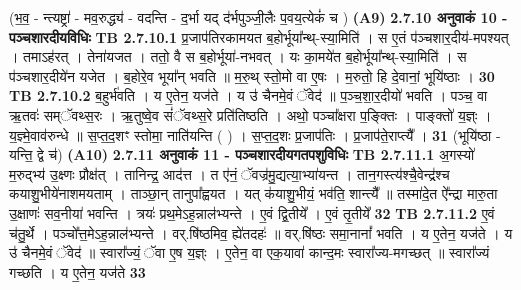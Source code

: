 \documentclass[17pt]{extarticle}
\begin{document}
{                  \newline
                                    (भ॒व॒ - न्त्यष्ट्रा॑ - मव॒रुद्ध्य॑ - वदन्ति - द॒र्भा यद् द॑र्भपुञ्जी॒लैः प॒वय॒त्येकं॑ च ) \textbf{(A9)} \newline \newline
                \textbf{ 2.7.10     अनुवाकं   10 - पञ्चशारदीयविधिः} \newline
                                \textbf{ TB 2.7.10.1} \newline
                  प्र॒जाप॑तिरकामयत ब॒होर्भूया᳚न्थ्-स्या॒मिति॑ । स ए॒तं प॑ञ्चशार॒दीय॑-मपश्यत् । तमाऽह॑रत् । तेना॑यजत । ततो॒ वै स ब॒होर्भूया॑-नभवत् । यः का॒मये॑त ब॒होर्भूया᳚न्थ्-स्या॒मिति॑ । स प॑ञ्चशार॒दीये॑न यजेत । ब॒होरे॒व भूया᳚न् भवति ॥ म॒रु॒थ् स्तो॒मो वा ए॒षः । म॒रुतो॒ हि दे॒वानां॒ भूयि॑ष्ठाः । \textbf{ 30} \newline
                  \newline
                                \textbf{ TB 2.7.10.2} \newline
                  ब॒हुर्भ॑वति । य ए॒तेन॒ यज॑ते । य उ॑ चैनमे॒वं ॅवेद॑ ॥ प॒ञ्च॒शा॒र॒दीयो॑ भवति । पञ्च॒ वा ऋ॒तवः॑ सम्ॅवथ्स॒रः । ऋ॒तुष्वे॒व सं॑ॅवथ्स॒रे प्रति॑तिष्ठति । अथो॒ पञ्चा᳚क्षरा प॒ङ्क्तिः । पाङ्क्तो॑ य॒ज्ञ्ः । य॒ज्ञ्मे॒वाव॑रुन्धे ॥ स॒प्त॒द॒शꣳ स्तोमा॒ नाति॑यन्ति ( ) । स॒प्त॒द॒शः प्र॒जाप॑तिः । प्र॒जाप॑ते॒राप्त्यै᳚ । \textbf{ 31} \newline
                  \newline
                                    (भूयि॑ष्ठा - यन्ति॒ द्वे च॑) \textbf{(A10)} \newline \newline
                \textbf{ 2.7.11     अनुवाकं   11 - पञ्चशारदीयगतपशुविधिः} \newline
                                \textbf{ TB 2.7.11.1} \newline
                  अ॒गस्यो॑ म॒रुद्भ्य॑ उ॒क्ष्णः प्रौक्ष॑त् । तानिन्द्र॒ आद॑त्त । त ए॑नं॒ ॅवज्र॑मु॒द्यत्या॒भ्या॑यन्त । तान॒गस्त्य॑श्चै॒वेन्द्र॑श्च कयाशु॒भीये॑नाशमयताम् । ताञ्छा॒न् तानुपा᳚ह्वयत । यत् क॑याशु॒भीयं॒ भव॑ति॒ शान्त्यै᳚ ॥ तस्मा॑दे॒त ऐ᳚न्द्रा मारु॒ता उ॒क्षाणः॑ सव॒नीया॑ भवन्ति । त्रयः॑ प्रथ॒मेऽह॒न्नाल॑भ्यन्ते । ए॒वं द्वि॒तीये᳚ । ए॒वं तृ॒तीये᳚ \textbf{ 32} \newline
                  \newline
                                \textbf{ TB 2.7.11.2} \newline
                  ए॒वं च॑तु॒र्थे । पञ्चो᳚त्त॒मेऽह॒न्नाल॑भ्यन्ते । वर्.षि॑ष्ठमिव॒ ह्ये॑तदहः॑ ॥ वर्.षि॑ष्ठः समा॒नानां᳚ भवति । य ए॒तेन॒ यज॑ते । य उ॑ चैनमे॒वं ॅवेद॑ ॥ स्वारा᳚ज्यं॒ ॅवा ए॒ष य॒ज्ञ्ः । ए॒तेन॒ वा एक॒यावा॑ कान्द॒मः स्वारा᳚ज्य-मगच्छत् ॥ स्वारा᳚ज्यं गच्छति । य ए॒तेन॒ यज॑ते \textbf{ 33} \newline
}
\end{document}
